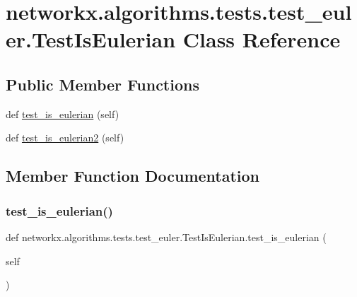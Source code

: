 \hypertarget{classnetworkx_1_1algorithms_1_1tests_1_1test__euler_1_1TestIsEulerian}{}\section{networkx.\+algorithms.\+tests.\+test\+\_\+euler.\+Test\+Is\+Eulerian Class Reference}
\label{classnetworkx_1_1algorithms_1_1tests_1_1test__euler_1_1TestIsEulerian}
\subsection*{Public Member Functions}
\begin{DoxyCompactItemize}
\item 
def \hyperlink{classnetworkx_1_1algorithms_1_1tests_1_1test__euler_1_1TestIsEulerian_ae3797b8a5b874f7697a2784484c7afee}{test\+\_\+is\+\_\+eulerian} (self)
\item 
def \hyperlink{classnetworkx_1_1algorithms_1_1tests_1_1test__euler_1_1TestIsEulerian_aa3e361c1d27a0d6388c8a647eb467f6a}{test\+\_\+is\+\_\+eulerian2} (self)
\end{DoxyCompactItemize}


\subsection{Member Function Documentation}
\mbox{\label{classnetworkx_1_1algorithms_1_1tests_1_1test__euler_1_1TestIsEulerian_ae3797b8a5b874f7697a2784484c7afee}} 
\subsubsection{\texorpdfstring{test\+\_\+is\+\_\+eulerian()}{test\_is\_eulerian()}}
{\footnotesize\ttfamily def networkx.\+algorithms.\+tests.\+test\+\_\+euler.\+Test\+Is\+Eulerian.\+test\+\_\+is\+\_\+eulerian (\begin{DoxyParamCaption}\item[{}]{self }\end{DoxyParamCaption})}

